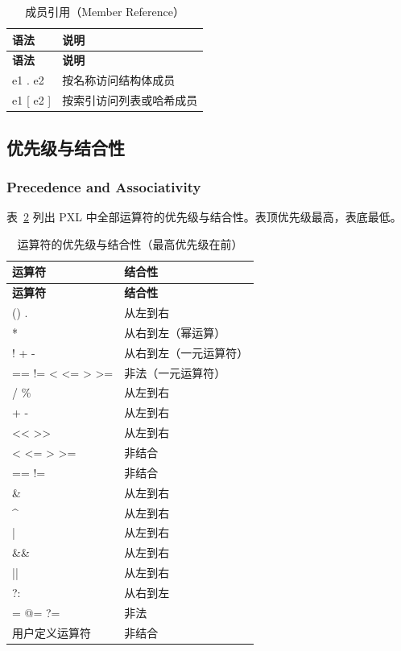 \begin{longtable}{@{}>{\raggedright\arraybackslash\ttfamily}p{} p{}@{}}
\caption{成员引用（Member Reference）}\label{tab:pxl-member-ref}\\
\toprule
\textbf{\textrm{语法}} & \textbf{\textrm{说明}} \\
\midrule
\endfirsthead
\toprule
\textbf{\textrm{语法}} & \textbf{\textrm{说明}} \\
\midrule
\endhead
\bottomrule
\endfoot
e1 . e2 & 按名称访问结构体成员 \\
e1 [ e2 ] & 按索引访问列表或哈希成员 \\
\end{longtable}

\subsection{优先级与结合性}
\subsubsection*{Precedence and Associativity}

表~\ref{tab:pxl-precedence} 列出 PXL 中全部运算符的优先级与结合性。表顶优先级最高，表底最低。

\begin{longtable}{@{}>{\raggedright\arraybackslash\ttfamily}p{} p{}@{}}
\caption{运算符的优先级与结合性（最高优先级在前）}\label{tab:pxl-precedence}\\
\toprule
\textbf{\textrm{运算符}} & \textbf{\textrm{结合性}} \\
\midrule
\endfirsthead
\toprule
\textbf{\textrm{运算符}} & \textbf{\textrm{结合性}} \\
\midrule
\endhead
\bottomrule
\endfoot
() \quad [] \quad . & 从左到右 \\
** & 从右到左（幂运算） \\
! \quad + \quad - & 从右到左（一元运算符） \\
== \quad != \quad < \quad <= \quad > \quad >= & 非法（一元运算符） \\
* \quad / \quad \% & 从左到右 \\
+ \quad - & 从左到右 \\
<< \quad >> & 从左到右 \\
< \quad <= \quad > \quad >= & 非结合 \\
== \quad != & 非结合 \\
\& & 从左到右 \\
\^{} & 从左到右 \\
| & 从左到右 \\
\&\& & 从左到右 \\
|| & 从左到右 \\
?: & 从右到左 \\
= \quad @= \quad ?= & 非法 \\
\textrm{用户定义运算符} & 非结合 \\
\end{longtable}

